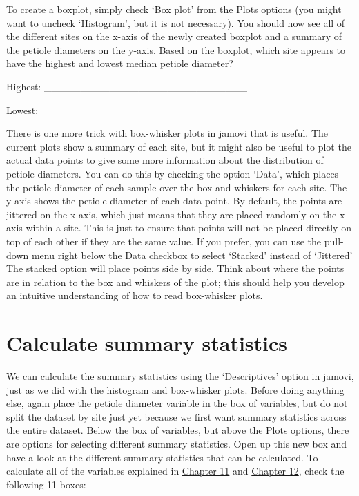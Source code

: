 \documentclass[
  openany]{krantz}
\begin{document}
To create a boxplot, simply check `Box plot' from the Plots options (you might want to uncheck `Histogram', but it is not necessary).
You should now see all of the different sites on the x-axis of the newly created boxplot and a summary of the petiole diameters on the y-axis.
Based on the boxplot, which site appears to have the highest and lowest median petiole diameter?

Highest: \_\_\_\_\_\_\_\_\_\_\_\_\_\_\_\_\_\_\_\_\_\_\_\_\_\_\_\_

Lowest: \_\_\_\_\_\_\_\_\_\_\_\_\_\_\_\_\_\_\_\_\_\_\_\_\_\_\_\_

There is one more trick with box-whisker plots in jamovi that is useful.
The current plots show a summary of each site, but it might also be useful to plot the actual data points to give some more information about the distribution of petiole diameters.
You can do this by checking the option `Data', which places the petiole diameter of each sample over the box and whiskers for each site.
The y-axis shows the petiole diameter of each data point.
By default, the points are jittered on the x-axis, which just means that they are placed randomly on the x-axis within a site.
This is just to ensure that points will not be placed directly on top of each other if they are the same value.
If you prefer, you can use the pull-down menu right below the Data checkbox to select `Stacked' instead of `Jittered'
The stacked option will place points side by side.
Think about where the points are in relation to the box and whiskers of the plot; this should help you develop an intuitive understanding of how to read box-whisker plots.

\hypertarget{calculate-summary-statistics}{%
\section{Calculate summary statistics}\label{calculate-summary-statistics}}

We can calculate the summary statistics using the `Descriptives' option in jamovi, just as we did with the histogram and box-whisker plots.
Before doing anything else, again place the petiole diameter variable in the box of variables, but do not split the dataset by site just yet because we first want summary statistics across the entire dataset.
Below the box of variables, but above the Plots options, there are options for selecting different summary statistics.
Open up this new box and have a look at the different summary statistics that can be calculated.
To calculate all of the variables explained in \protect\hyperlink{Chapter_11}{Chapter 11} and \protect\hyperlink{Chapter_12}{Chapter 12}, check the following 11 boxes:
\end{document}
